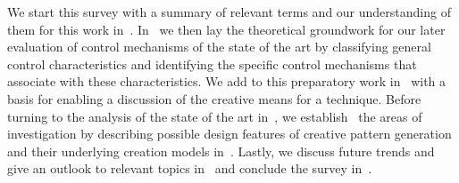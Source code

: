 We start this survey with a summary of relevant terms and our understanding of them for this work in~. In~ we then lay the theoretical groundwork for our later evaluation of control mechanisms of the state of the art by classifying general control characteristics and identifying the specific control mechanisms that associate with these characteristics. We add to this preparatory work in~ with a basis for enabling a discussion of the creative means for a technique. Before turning to the analysis of the state of the art in~, we establish~ the areas of investigation by describing possible design features of creative pattern generation and their underlying creation models in~. Lastly, we discuss future trends and give an outlook to relevant topics in~ and conclude the survey in~.